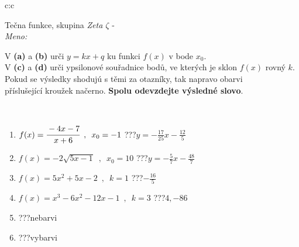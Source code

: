 \documentclass[10pt]{report}
\begin{document}
\newpage
\thispagestyle{empty}
\begin{tabular}{c:c}
\begin{minipage}[c][104.5mm][t]{0.5\linewidth}
\begin{center}
\vspace{7mm}
{\huge Tečna funkce, skupina \textit{Zeta $\zeta$} -}\\[5mm]
\textit{Meno:}\phantom{xxxxxxxxxxxxxxxxxxxxxxxxxxxxxxxxxxxxxxxxxxxxxxxxxxxxxxxxxxxxxxxxx}\\[5mm]
\begin{minipage}{0.95\linewidth}
\begin{center}
V \textbf{(a)} a \textbf{(b)} urči  $y = kx + q$ ku funkci $f(x)$ v bode $x_0$.\\V \textbf{(c)} a \textbf{(d)} urči ypsilonové souřadnice bodů, ve kterých je sklon $f(x)$ rovný $k$.\\Pokud se výsledky shodujú s těmi za otazníky, tak napravo obarvi\\příslušející kroužek načerno. \textbf{Spolu odevzdejte výsledné slovo}.
\end{center}
\end{minipage}
\\[1mm]
\begin{minipage}{0.79\linewidth}
\begin{center}
\begin{varwidth}{\linewidth}
\begin{enumerate}
\small
\item $f(x)=\cfrac{-4x-7}{x+6}\enspace , \enspace x_0=-1$\quad \dotfill\; ???\;\dotfill \quad $y = -\frac{17}{25}x-\frac{12}{5}$
\item $f(x)=-2\sqrt{5x-1}\enspace , \enspace x_0=10$\quad \dotfill\; ???\;\dotfill \quad $y = -\frac{5}{7}x-\frac{48}{7}$
\item $f(x)=5x^2+5x-2\enspace , \enspace k=1$\quad \dotfill\; ???\;\dotfill \quad $-\frac{16}{5}$
\item $f(x)=x^3-6x^2-12x-1\enspace , \enspace k=3$\quad \dotfill\; ???\;\dotfill \quad $4 , -86$
\item \quad \dotfill\; ???\;\dotfill \quad nebarvi
\item \quad \dotfill\; ???\;\dotfill \quad vybarvi
\end{enumerate}
\end{varwidth}
\end{center}
\end{minipage}
\begin{minipage}{0.20\linewidth}

\end{minipage}
\end{center}
\end{minipage}
\end{tabular}
\end{document}
